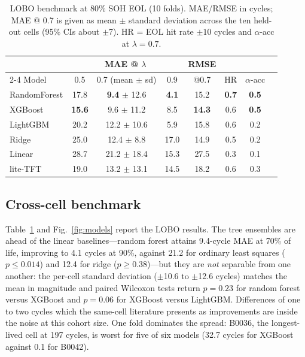 \documentclass[conference,a4paper]{IEEEtran}
\begin{document}
\begin{table}[!htbp]
\caption{LOBO benchmark at 80\% SOH EOL (10 folds). MAE/RMSE in cycles;
MAE @ 0.7 is given as mean $\pm$ standard deviation across the ten held-out
cells (95\% CIs about $\pm$7). HR = EOL hit rate $\pm 10$ cycles and $\alpha$-acc at $\lambda=0.7$.}
\label{tab:lobo}
\centering
\small
\setlength{\tabcolsep}{3pt}
\begin{tabular}{lccccccc}
\toprule
 & \multicolumn{3}{c}{MAE @ $\lambda$} & RMSE & & \\
\cmidrule(lr){2-4}
Model & 0.5 & 0.7 (mean $\pm$ sd) & 0.9 & @0.7 & HR & $\alpha$-acc \\
\midrule
RandomForest & 17.8 & \textbf{9.4} $\pm$ 12.6 & \textbf{4.1} & 15.2 & \textbf{0.7} & \textbf{0.5} \\
XGBoost      & \textbf{15.6} & 9.6 $\pm$ 11.2 & 8.5 & \textbf{14.3} & 0.6 & \textbf{0.5} \\
LightGBM     & 20.2 & 12.2 $\pm$ 10.6 & 5.9 & 15.8 & 0.6 & 0.2 \\
Ridge        & 25.0 & 12.4 $\pm$ 8.8 & 17.0 & 14.9 & 0.5 & 0.2 \\
Linear       & 28.7 & 21.2 $\pm$ 18.4 & 15.3 & 27.5 & 0.3 & 0.1 \\
lite-TFT     & 19.0 & 13.2 $\pm$ 13.1 & 14.5 & 18.2 & 0.6 & 0.3 \\
\bottomrule
\end{tabular}
\end{table}

\subsection{Cross-cell benchmark}
Table~\ref{tab:lobo} and Fig.~\ref{fig:models} report the LOBO results. The tree ensembles are
ahead of the linear baselines---random forest attains 9.4-cycle MAE at 70\% of
life, improving to 4.1 cycles at 90\%, against 21.2 for ordinary least
squares ($p\leq0.014$) and 12.4 for ridge ($p\geq0.38$)---but they are \emph{not} separable from one another: the per-cell
standard deviation ($\pm$10.6 to $\pm$12.6 cycles) matches the mean in
magnitude and paired Wilcoxon tests return $p=0.23$ for random forest versus
XGBoost and $p=0.06$ for XGBoost versus LightGBM. Differences of one to two cycles
which the same-cell literature presents as improvements are inside the noise
at this cohort size. One fold dominates the spread: B0036, the longest-lived
cell at 197 cycles, is worst for five of six models (32.7 cycles for XGBoost
against 0.1 for B0042).
\end{document}

